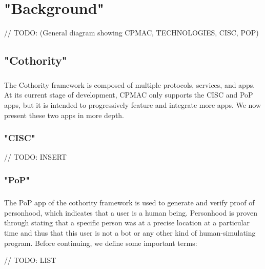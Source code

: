 \chapter{"Background"}

// TODO: (General diagram showing CPMAC, TECHNOLOGIES, CISC, POP)

\section{"Cothority"}

\paragraph{}
The Cothority framework is composed of multiple protocols, services, and apps. At its current stage of development, CPMAC only supports the CISC and PoP apps, but it is intended to progressively feature and integrate more apps. We now present these two apps in more depth.

\subsection{"CISC"}

// TODO: INSERT

\subsection{"PoP"}

\paragraph{}
The PoP app of the cothority framework is used to generate and verify proof of personhood, which indicates that a user is a human being. Personhood is proven through stating that a specific person was at a precise location at a particular time and thus that this user is not a bot or any other kind of human-simulating program. Before continuing, we define some important terms:

// TODO: LIST

